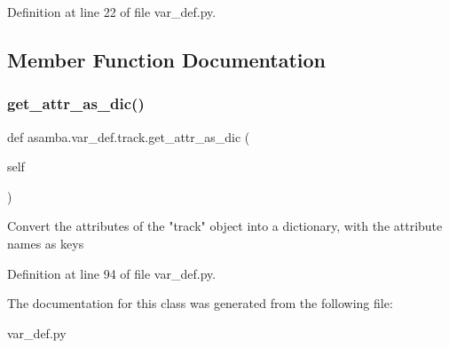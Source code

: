 Definition at line 22 of file var\+\_\+def.\+py.



\subsection{Member Function Documentation}
\mbox{\label{classasamba_1_1var__def_1_1track_aec000211bbf1940b5c05b0bcd380fc2a}} 
\subsubsection{\texorpdfstring{get\+\_\+attr\+\_\+as\+\_\+dic()}{get\_attr\_as\_dic()}}
{\footnotesize\ttfamily def asamba.\+var\+\_\+def.\+track.\+get\+\_\+attr\+\_\+as\+\_\+dic (\begin{DoxyParamCaption}\item[{}]{self }\end{DoxyParamCaption})}

\begin{DoxyVerb}Convert the attributes of the "track" object into a dictionary, with the attribute names as keys
\end{DoxyVerb}
 

Definition at line 94 of file var\+\_\+def.\+py.



The documentation for this class was generated from the following file\+:\begin{DoxyCompactItemize}
\item 
var\+\_\+def.\+py\end{DoxyCompactItemize}
